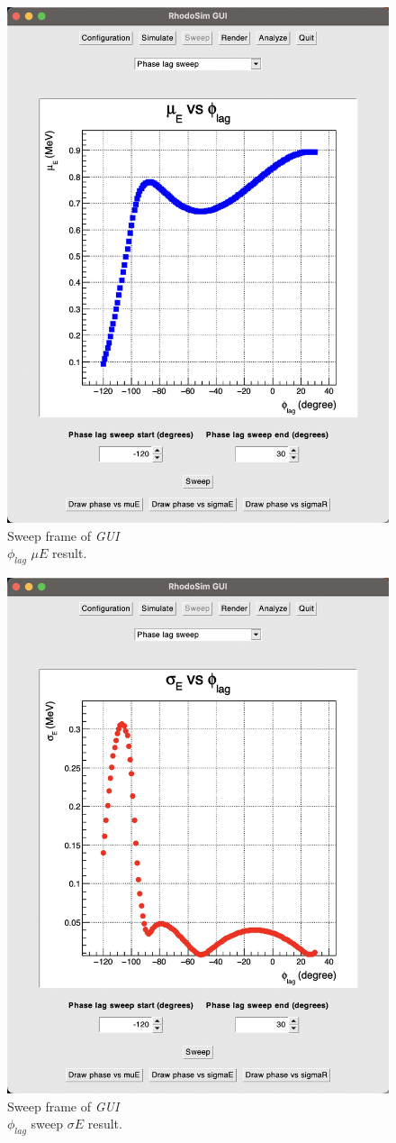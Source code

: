 \documentclass[a4paper,oneside,12pt]{report}
\numberwithin{equation}{chapter}
\begin{document}
\begin{figure}
    \centering
    \includegraphics[width=0.8\linewidth]{./figures/rhodoSim/GUI_sweep_muE.png}
    \caption{Sweep frame of \textit{GUI} \\ $\phi_{lag}$ $\mu E$ result.}
    \label{fig:gui_sweep_muE}
\end{figure}
\begin{figure}
    \centering
    \includegraphics[width=0.8\linewidth]{./figures/rhodoSim/GUI_sweep_sE.png}
    \caption{Sweep frame of \textit{GUI} \\ $\phi_{lag}$ sweep $\sigma E$ result.}
    \label{fig:gui_sweep_sE}
\end{figure}
\end{document}
